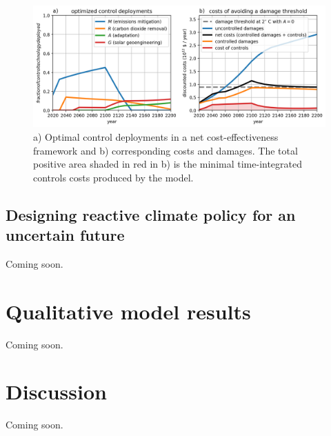 \documentclass{article}
\begin{document}
\begin{figure}[htb!]
\noindent\includegraphics[width=1.0\textwidth]{figures/default-temp_controls_and_damages.png}
\centering
\caption{a) Optimal control deployments in a net cost-effectiveness framework and b) corresponding costs and damages. The total positive area shaded in red in b) is the minimal time-integrated controls costs produced by the model.}
\label{fig.approach2}
\end{figure}

\subsection{Designing reactive climate policy for an uncertain future}

Coming soon.

\section{Qualitative model results}

Coming soon.



\section{Discussion}

Coming soon.



%

\end{document}
